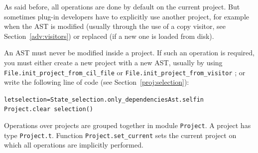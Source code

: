 As said before, all operations are done by default on the current
project. But sometimes plug-in developers have to
explicitly use another project, for example when the AST is
modified (usually through the use of a copy
visitor, see Section~\ref{adv:visitors}) or replaced (\eg if
a new one is loaded from disk).

\begin{important}
  An AST must never be modified inside a
  project. If such an operation is required, you
  must either create a new project with a new AST, usually by using
  \texttt{File.init\_project\_from\_cil\_file}%
  or \texttt{File.init\_project\_from\_visitor}%
  ;
  or write the following line of code (see Section~\ref{proj:selection}):
  \begin{alltt}
  let selection = State_selection.only_dependencies Ast.self in
  Project.clear ~selection ()
  \end{alltt}
\end{important}

Operations over projects are grouped together in module
\texttt{Project}. A project has type
\texttt{Project.t}. Function
\texttt{Project.set\_current} sets the
current project on which all operations are implicitly performed.

